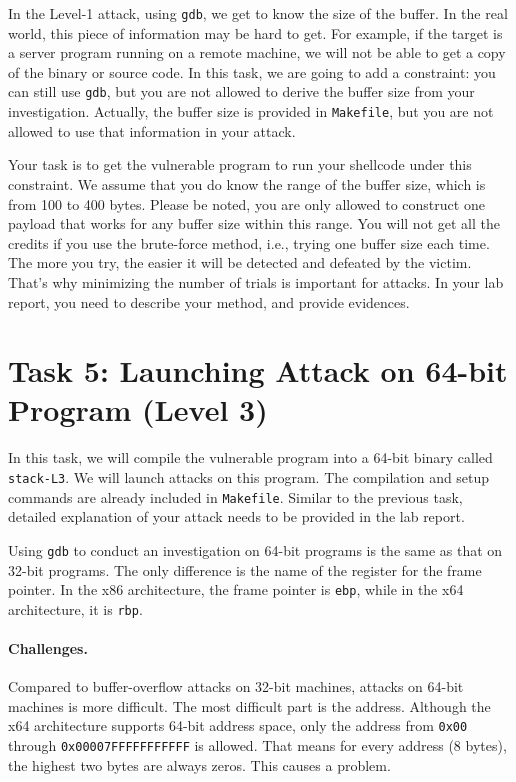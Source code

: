 In the Level-1 attack, using \texttt{gdb}, we get to know 
the size of the buffer. In the real world, this piece of information
may be hard to get. For example, if the target is a server program
running on a remote machine, we will not be able to get a copy
of the binary or source code. In this task, we are going to add a 
constraint: you can still use \texttt{gdb}, but you are not allowed
to derive the buffer size from your investigation. Actually, the 
buffer size is provided in \texttt{Makefile}, but you are not allowed
to use that information in your attack.

Your task is to get the vulnerable program to run your shellcode 
under this constraint. We assume that you do know the range of the 
buffer size, which is from 100 to 400 bytes. 
Please be noted, you are only allowed
to construct one payload that works for any buffer size
within this range.  You will not get all the credits if you
use the brute-force method, i.e., trying one buffer size
each time. The more you try, the easier it will be detected
and defeated by the victim. That's why minimizing the number
of trials is important for attacks.
In your lab report, you need to describe your method,
and provide evidences.



\section{Task 5: Launching Attack on 64-bit Program (Level 3)}

In this task, we will compile the vulnerable program 
into a 64-bit binary called \texttt{stack-L3}.  
We will launch attacks on this program. The compilation and setup
commands are already included in \texttt{Makefile}. Similar to
the previous task, detailed explanation of your attack needs to be provided 
in the lab report. 


Using \texttt{gdb} to conduct an investigation on 64-bit programs 
is the same as that on 32-bit programs.
The only difference is the name of the register for the frame pointer.
In the x86 architecture,
the frame pointer is \texttt{ebp}, while in the x64 architecture,
it is \texttt{rbp}. 


\paragraph{Challenges.} Compared to buffer-overflow attacks on 32-bit
machines, attacks on 64-bit machines is more difficult. The most
difficult part is the address. Although the x64 architecture
supports 64-bit address space, only the address from
\texttt{0x00} through \texttt{0x00007FFFFFFFFFFF} is allowed. That means for
every address (8 bytes), the highest two bytes are always zeros.
This causes a problem.

